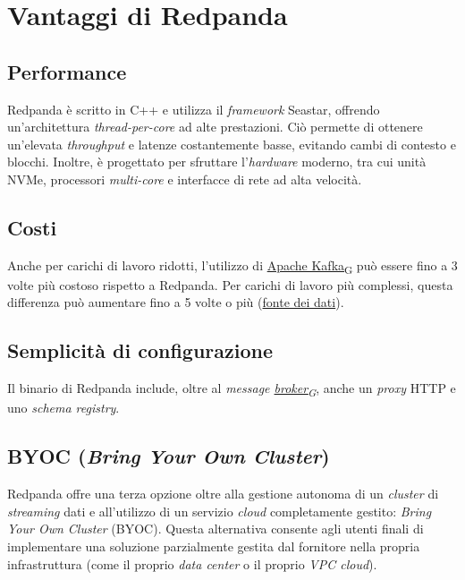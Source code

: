 \section{Vantaggi di Redpanda}
\subsection{Performance}
Redpanda è scritto in C++ e utilizza il \textit{framework} Seastar, offrendo un'architettura \textit{thread-per-core} ad alte prestazioni.
Ciò permette di ottenere un'elevata \textit{throughput} e latenze costantemente basse, evitando cambi di contesto e blocchi.
Inoltre, è progettato per sfruttare l'\textit{hardware} moderno, tra cui unità NVMe, processori \textit{multi-core} e interfacce di rete ad alta velocità.

\subsection{Costi}
Anche per carichi di lavoro ridotti, l'utilizzo di \href{https://7last.github.io/docs/rtb/documentazione-interna/glossario\#apache-kafka}{Apache Kafka\textsubscript{G}} può essere fino a 3 volte più costoso rispetto a Redpanda. Per carichi di lavoro più complessi, questa differenza può aumentare fino a 5 volte o più (\href{https://redpanda.com/blog/is-redpanda-better-than-kafka-tco-comparison}{fonte dei dati}).

\subsection{Semplicità di configurazione}
Il binario di Redpanda include, oltre al \textit{message \href{https://7last.github.io/docs/rtb/documentazione-interna/glossario\#broker}{broker\textsubscript{G}}}, anche un \textit{proxy} HTTP e uno \textit{schema registry}.

\subsection{BYOC (\textit{Bring Your Own Cluster})}
Redpanda offre una terza opzione oltre alla gestione autonoma di un \textit{cluster} di \textit{streaming}
dati e all'utilizzo di un servizio \textit{cloud} completamente gestito: \textit{Bring Your Own Cluster} (BYOC).
Questa alternativa consente agli utenti finali di implementare una soluzione parzialmente gestita dal fornitore nella propria infrastruttura (come il proprio \textit{data center}
o il proprio \textit{VPC cloud}).

